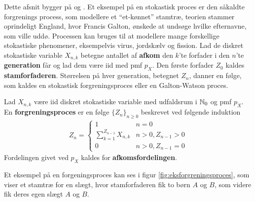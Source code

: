 Dette afsnit bygger på \cite{sandsynlighedsBog} og \cite{grimsandsynlighedsBog}.
Et eksempel på en stokastisk proces er den såkaldte forgrenings process, som modellere et ``et-kønnet'' stamtræ, teorien stammer oprindeligt England, hvor Francis Galton, ønskede at undsøge hvilke efternavne, som ville uddø. Processen kan bruges til at modellere mange forskellige stokastiske phenomener, eksempelvis virus, jordskælv og fission.
Lad de diskret stokastiske variable $X_{n,k}$ betegne antallet af \textbf{afkom} den $k$'te forfader i den $n$'te \textbf{generation} får og lad dem være iid med pmf $p_X$. Den første forfader $Z_0$ kaldes \textbf{stamforfaderen}.
Størrelsen på hver generation, betegnet $Z_n$, danner en følge, som kaldes en stokastisk forgreningsproces eller en Galton-Watson proces.
\begin{defn}\label{def:forgreningsproces}
Lad $X_{n,k}$ være iid diskret stokastiske variable med udfaldsrum i $\mathbb{N}_0$ og pmf $p_X$. En \textbf{forgreningsproces} er en følge $\{Z_n\}_{n\geq 0}$ beskrevet ved følgende induktion
\begin{align*}
    Z_n=\begin{cases}
        1&n=0\\
        \sum_{k=1}^{Z_{n-1}}X_{n,k}&n>0,Z_{n-1}>0\\
        0&n>0,Z_{n-1}=0
        \end{cases}
\end{align*}
Fordelingen givet ved $p_X$ kaldes for \textbf{afkomsfordelingen}.
\end{defn}

Et eksempel på en forgeningsproces kan ses i figur \ref{fig:eksforgreningsproces}, som viser et stamtræ for en slægt, hvor stamforfaderen fik to børn $A$ og $B$, som videre fik deres egen slægt $A$ og $B$.

